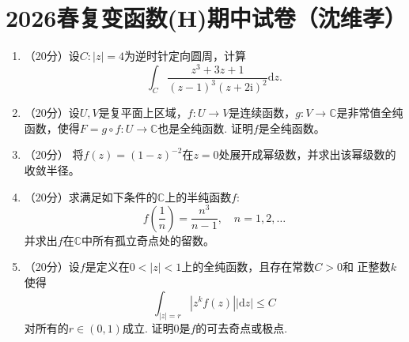 \section{2026春复变函数(H)期中试卷（沈维孝）}
\begin{enumerate}
\item[一]（20分）设\(C : |z| = 4\)为逆时针定向圆周，计算
\[
    \int_C \frac{z^3 + 3z + 1}{(z - 1)^3(z + 2\mathrm{i})^2}\mathrm{d}z.
\]
\item[二]（20分）设\(U, V\)是复平面上区域，\(f : U \to V\)是连续函数，\(g : V \to 
\mathbb{C}\)是非常值全纯函数，使得\(F = g \circ f : U \to \mathbb{C}\)也是全纯函数. 
证明\(f\)是全纯函数。
\item[三]（20分）
将\(f(z) = (1 - z)^{-2}\)在\(z = 0\)处展开成幂级数，并求出该幂级数的收敛半径。
\item[四]（20分）求满足如下条件的\(\mathbb{C}\)上的半纯函数\(f\):
\[
    f\left( \frac{1}{n} \right) = \frac{n^3}{n-1},\quad n = 1, 2, \dots
\]
并求出\(f\)在\(\mathbb{C}\)中所有孤立奇点处的留数。
\item[五]（20分）设\(f\)是定义在\(0 < |z| < 1\)上的全纯函数，且存在常数\(C > 0\)和
正整数\(k\)使得
\[
    \int_{|z| = r}\left| z^k f(z) \right||\mathrm{d}z| \le C
\]
对所有的\(r \in (0, 1)\)成立. 证明\(0\)是\(f\)的可去奇点或极点.
\end{enumerate}

